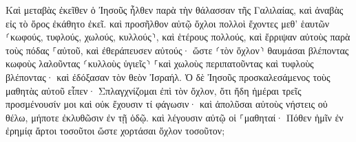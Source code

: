 \documentclass{openreader}
\begin{document}
Καὶ μεταβὰς ἐκεῖθεν ὁ Ἰησοῦς ἦλθεν παρὰ τὴν θάλασσαν τῆς Γαλιλαίας, καὶ ἀναβὰς εἰς τὸ ὄρος ἐκάθητο ἐκεῖ. 
καὶ προσῆλθον αὐτῷ ὄχλοι πολλοὶ ἔχοντες μεθ’ ἑαυτῶν ⸂κωφούς, τυφλούς, χωλούς, κυλλούς⸃, καὶ ἑτέρους πολλούς, καὶ ἔρριψαν αὐτοὺς παρὰ τοὺς πόδας ⸀αὐτοῦ, καὶ ἐθεράπευσεν αὐτούς· 
ὥστε ⸂τὸν ὄχλον⸃ θαυμάσαι βλέποντας κωφοὺς λαλοῦντας ⸂κυλλοὺς ὑγιεῖς⸃ ⸀καὶ χωλοὺς περιπατοῦντας καὶ τυφλοὺς βλέποντας· καὶ ἐδόξασαν τὸν θεὸν Ἰσραήλ. 
Ὁ δὲ Ἰησοῦς προσκαλεσάμενος τοὺς μαθητὰς αὐτοῦ εἶπεν· Σπλαγχνίζομαι ἐπὶ τὸν ὄχλον, ὅτι ἤδη ἡμέραι τρεῖς προσμένουσίν μοι καὶ οὐκ ἔχουσιν τί φάγωσιν· καὶ ἀπολῦσαι αὐτοὺς νήστεις οὐ θέλω, μήποτε ἐκλυθῶσιν ἐν τῇ ὁδῷ. 
καὶ λέγουσιν αὐτῷ οἱ ⸀μαθηταί· Πόθεν ἡμῖν ἐν ἐρημίᾳ ἄρτοι τοσοῦτοι ὥστε χορτάσαι ὄχλον τοσοῦτον; 
\end{document}
